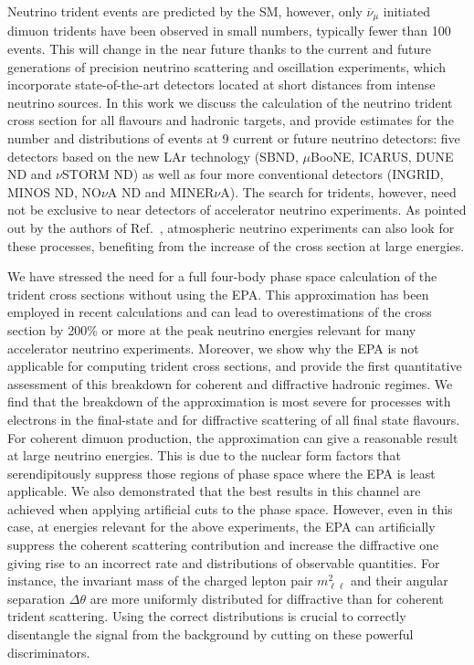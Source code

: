 \label{sec:conc}
Neutrino trident events are predicted by the SM, however, only $\overline{\nu}_\mu$ initiated dimuon tridents have been observed in small numbers, typically fewer than 100 events. This will change in the near future thanks to the current and future generations of precision neutrino scattering and oscillation experiments, which incorporate state-of-the-art detectors located at short distances from intense neutrino sources. 
%
In this work we discuss the calculation of the neutrino trident cross section for all flavours and hadronic targets, and provide estimates for the number and distributions of events at 9 current or future neutrino detectors: five detectors based on the new LAr technology (SBND, $\mu$BooNE, ICARUS, DUNE ND and $\nu$STORM ND) as well as four more conventional detectors (INGRID, MINOS ND, NO$\nu$A ND and MINER$\nu$A). The search for tridents, however, need not be exclusive to near detectors of accelerator neutrino experiments. As pointed out by the authors of Ref.~\cite{Ge2017}, atmospheric neutrino experiments can also look for these processes, benefiting from the increase of the cross section at large energies. 

We have stressed the need for a full four-body phase space calculation of the trident cross sections without using the EPA. This approximation has been employed in recent calculations and can lead to overestimations of the cross section by 200\% or more at the peak neutrino energies relevant for many accelerator neutrino experiments.
%
Moreover, we show why the EPA is not applicable for computing trident cross sections, and provide the first quantitative assessment of this breakdown for coherent and diffractive hadronic regimes. 
%
We find that the breakdown of the approximation is most severe for processes with electrons in the final-state and for diffractive scattering of all final state flavours. 
%
For coherent dimuon production, the approximation can give a reasonable result at large neutrino energies. This is due to the nuclear form factors that serendipitously suppress those regions of phase space where the EPA is least applicable. We also demonstrated that the best results in this channel are achieved when applying artificial cuts to the phase space.
%
However, even in this case, at energies relevant for the above experiments, the EPA can artificially suppress the coherent scattering contribution and increase the diffractive one giving rise to an incorrect rate and distributions of observable quantities. 
%
For instance, the invariant mass of the charged lepton pair $m^2_{\ell \ell}$ and their angular separation $\Delta \theta$ are more uniformly distributed for diffractive than for coherent trident scattering. Using the correct distributions is crucial to correctly disentangle the signal from the background by cutting on these powerful discriminators.

